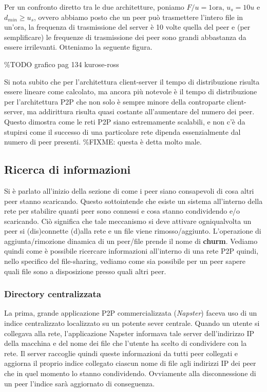 Per un confronto diretto tra le due architetture, poniamo
$F/u = 1 \text{ora}$, $u_s = 10u$ e $d_{min} \geq u_s$, ovvero abbiamo
posto che un peer può trasmettere l'intero file in un'ora, la frequenza
di trasmissione del server è 10 volte quella del peer e (per
semplificare) le frequenze di trasmissione dei peer sono grandi
abbastanza da essere irrilevanti. Otteniamo la seguente figura.

\%TODO grafico pag 134 kurose-ross

Si nota subito che per l'architettura client-server il tempo di
distribuzione risulta essere lineare come calcolato, ma ancora più
notevole è il tempo di distribuzione per l'architettura P2P che non solo
è sempre minore della controparte client-server, ma addirittura risulta
quasi costante all'aumentare del numero dei peer. Questo dimostra come
le reti P2P siano estremamente scalabili, e non c'è da stupirsi come il
successo di una particolare rete dipenda essenzialmente dal numero di
peer presenti. \%FIXME: questa è detta molto male.

\subsection{Ricerca di informazioni}\label{ricerca-di-informazioni}

Si è parlato all'inizio della sezione di come i peer siano consapevoli
di cosa altri peer stanno scaricando. Questo sottointende che esiste un
sistema all'interno della rete per stabilire quanti peer sono connessi e
cosa stanno condividendo e/o scaricando. Ciò significa che tale
meccanismo si deve attivare ogniqualvolta un peer si (dis)connette
(d)alla rete e un file viene rimosso/aggiunto. L'operazione di
aggiunta/rimozione dinamica di un peer/file prende il nome di
\textbf{churm}. Vediamo quindi come è possibile ricercare informazioni
all'interno di una rete P2P quindi, nello specifico del file-sharing,
vediamo come sia possibile per un peer sapere quali file sono a
disposizione presso quali altri peer.

\subsubsection{Directory centralizzata}\label{directory-centralizzata}

La prima, grande applicazione P2P commercializzata (\emph{Napster})
faceva uso di un indice centralizzato localizzato su un potente sever
centrale. Quando un utente si collegava alla rete, l'applicazione
Napster informava tale server dell'indirizzo IP della macchina e del
nome dei file che l'utente ha scelto di condividere con la rete. Il
server raccoglie quindi queste informazioni da tutti peer collegati e
aggiorna il proprio indice collegato ciascun nome di file agli indirizzi
IP dei peer che in quel momento lo stanno condividendo. Ovviamente alla
disconnessione di un peer l'indice sarà aggiornato di conseguenza.

